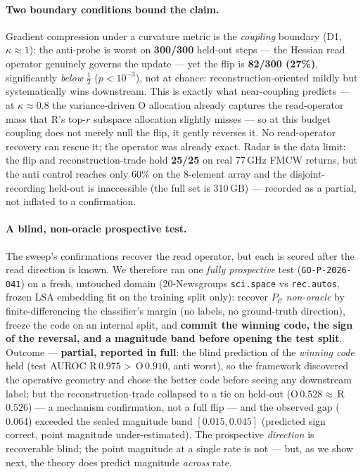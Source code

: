 \documentclass[11pt]{article}
\theoremstyle{remark}
\newcommand{\PC}{P_{\mathcal{C}}}
\newcommand{\kalign}{\kappa}
\newcommand{\seal}[1]{\texttt{GO-P-2026-#1}}
\begin{document}
\paragraph{Two boundary conditions bound the claim.} Gradient compression under a
curvature metric is the \emph{coupling} boundary (D1, $\kalign\approx1$): the anti-probe
is worst on \textbf{300/300} held-out steps --- the Hessian read operator genuinely
governs the update --- yet the flip is \textbf{82/300 (27\%)}, significantly \emph{below}
$\tfrac12$ ($p<10^{-3}$), not at chance: reconstruction-oriented mildly but systematically
wins downstream. This is exactly what near-coupling predicts --- at $\kalign\approx0.8$ the
variance-driven O allocation already captures the read-operator mass that R's top-$r$
subspace allocation slightly misses --- so at this budget coupling does not merely null the
flip, it gently reverses it. No read-operator recovery can rescue it; the operator was
already exact. Radar is the data limit: the flip and reconstruction-trade hold
\textbf{25/25} on real 77\,GHz FMCW returns, but the anti control reaches only 60\% on the
8-element array and the disjoint-recording held-out is inaccessible (the full set is
310\,GB) --- recorded as a partial, not inflated to a confirmation.

\paragraph{A blind, non-oracle prospective test.} The sweep's confirmations recover the read
operator, but each is scored after the read direction is known. We therefore ran one
\emph{fully prospective} test (\seal{041}) on a fresh, untouched domain (20-Newsgroups
\texttt{sci.space} vs \texttt{rec.autos}, frozen LSA embedding fit on the training split
only): recover $\PC$ \emph{non-oracle} by finite-differencing the classifier's margin (no
labels, no ground-truth direction), freeze the code on an internal split, and \textbf{commit
the winning code, the sign of the reversal, and a magnitude band before opening the test
split}. Outcome --- \textbf{partial, reported in full}: the blind prediction of the
\emph{winning code} held (test AUROC R\,$0.975>$\,O\,$0.910$, anti worst), so the framework
discovered the operative geometry and chose the better code before seeing any downstream
label; but the reconstruction-trade collapsed to a tie on held-out (O\,$0.528\approx$\,R\,$0.526$)
--- a mechanism confirmation, not a full flip --- and the observed gap ($0.064$) exceeded the
sealed magnitude band $[0.015,0.045]$ (predicted sign correct, point magnitude
under-estimated). The prospective \emph{direction} is recoverable blind; the point magnitude
at a single rate is not --- but, as we show next, the theory does predict magnitude
\emph{across} rate.
\end{document}

